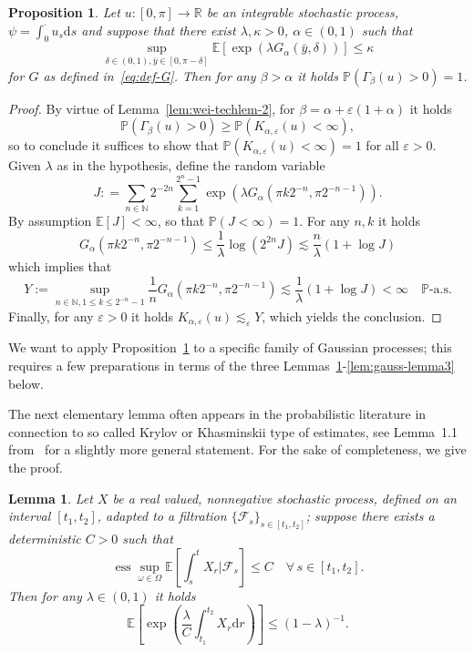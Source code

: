 \documentclass[11pt,oneside,reqno]{amsart}
\newcommand{\assign}{:=}
\newcommand{\mathd}{\mathrm{d}}
\newcommand{\tmop}[1]{\ensuremath{\operatorname{#1}}}
\newtheorem{lemma}[theorem]{Lemma}
\newtheorem{proposition}[theorem]{Proposition}
{\theoremstyle{remark}\newtheorem{remark}[theorem]{Remark}}
\numberwithin{equation}{section}
\begin{document}
\begin{proposition}
  \label{prop:sufficient-stochastic}Let $u : [0, \pi] \rightarrow \mathbb{R}$
  be an integrable stochastic process, $\psi = \int_0^{\cdot} u_s \mathd s$
  and suppose that there exist $\lambda, \kappa > 0$, $\alpha \in (0, 1)$ such
  that
  \[ \sup_{\delta \in (0, 1), \bar{y} \in [0, \pi - \delta]} \mathbb{E} [\exp
     (\lambda G_{\alpha} (\bar{y}, \delta))] \leqslant \kappa \]
  for $G$ as defined in~\eqref{eq:def-G}. Then for any $\beta > \alpha$ it
  holds $\mathbb{P} (\Gamma_{\beta} (u) > 0) = 1$.
\end{proposition}

\begin{proof}
  By virtue of Lemma~\ref{lem:wei-techlem-2}, for $\beta = \alpha +
  \varepsilon (1 + \alpha)$ it holds
  \[ \mathbb{P} (\Gamma_{\beta} (u) > 0) \geqslant \mathbb{P} (K_{\alpha,
     \varepsilon} (u) < \infty), \]
  so to conclude it suffices to show that $\mathbb{P} (K_{\alpha, \varepsilon}
  (u) < \infty) = 1$ for all $\varepsilon > 0$. Given $\lambda$ as in the
  hypothesis, define the random variable
  \[ J : = \sum_{n \in \mathbb{N}} 2^{- 2 n} \sum_{k = 1}^{2^n - 1} \exp
     (\lambda G_{\alpha} (\pi k 2^{- n}, \pi 2^{- n - 1})) . \]
  By assumption $\mathbb{E} [J] < \infty$, so that $\mathbb{P} (J < \infty) =
  1$. For any $n, k$ it holds
  \[ G_{\alpha} (\pi k 2^{- n}, \pi 2^{- n - 1}) \leqslant \frac{1}{\lambda}
     \log (2^{2 n} J) \lesssim \frac{n}{\lambda}  (1 + \log J) \]
  which implies that
  \[ Y \assign \sup_{n \in \mathbb{N}, 1 \leqslant k \leqslant 2^{- n} - 1}
     \frac{1}{n} G_{\alpha} (\pi k 2^{- n}, \pi 2^{- n - 1}) \lesssim
     \frac{1}{\lambda} (1 + \log J) < \infty \quad \mathbb{P} \text{-a.s.} \]
  Finally, for any $\varepsilon > 0$ it holds $K_{\alpha, \varepsilon} (u)
  \lesssim_{\varepsilon} Y$, which yields the conclusion.
\end{proof}

We want to apply Proposition~\ref{prop:sufficient-stochastic} to a specific
family of Gaussian processes; this requires a few preparations in terms of the
three Lemmas~\ref{lem:gauss-lemma1}-\ref{lem:gauss-lemma3} below.

The next elementary lemma often appears in the probabilistic literature in
connection to so called Krylov or Khasminskii type of estimates, see Lemma~1.1
from~{\cite{portenko1990}} for a slightly more general statement. For the sake
of completeness, we give the proof.

\begin{lemma}
  \label{lem:gauss-lemma1}Let $X$ be a real valued, nonnegative stochastic
  process, defined on an interval $[t_1, t_2]$, adapted to a filtration $\{
  \mathcal{F}_s \}_{s \in [t_1, t_2]}$; suppose there exists a deterministic
  $C > 0$ such that
  \[ \tmop{ess} \sup_{\omega \in \Omega} \mathbb{E} \left[ \int_s^t X_r |
     \mathcal{F}_s \right] \leqslant C \quad \forall \, s \in [t_1, t_2] . \]
  Then for any $\lambda \in (0, 1)$ it holds
  \[ \mathbb{E} \left[ \exp \left( \frac{\lambda}{C} \int_{t_1}^{t_2} X_r
     \mathd r \right) \right] \leqslant (1 - \lambda)^{- 1} . \]
\end{lemma}
\end{document}
